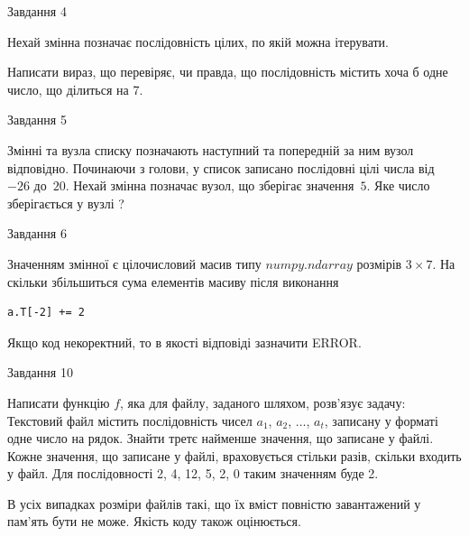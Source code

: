 \documentclass[12pt, ukrainian]{article}
\begin{document}
{               
{\begin{center}Завдання {4}\end{center}}
\vspace{-6mm}
Нехай змінна  позначає послідовність цілих, по якій можна ітерувати.

Написати вираз, що перевіряє, чи правда, що послідовність  містить хоча б одне число, що ділиться на 7.\par

\vspace{10mm}
               
{\begin{center}Завдання {5}\end{center}}
\vspace{-6mm}
Змінні  та  вузла списку позначають наступний та попередній за ним вузол відповідно. Починаючи з голови, у список записано послідовні цілі числа від~$-26$ до~$20$. Нехай змінна  позначає вузол, що зберігає значення~$5$.
Яке число зберігається у вузлі  ?\par

               
{\begin{center}Завдання {6}\end{center}}
\vspace{-6mm}
Значенням змінної  є цілочисловий масив типу $numpy.ndarray$ розмірів $3{\times}7$. На скільки збільшиться сума елементів масиву  після виконання
\begin{verbatim}
a.T[-2] += 2
\end{verbatim}


Якщо код некоректний, то в якості відповіді зазначити ERROR.\par

               
{\begin{center}Завдання {10}\end{center}}
\vspace{-6mm}

Написати функцію $f$, яка для файлу, заданого шляхом, розв’язує задачу:\\ Текстовий файл містить послідовність чисел $a_1$, $a_2$, $\ldots$, $a_t$, записану у форматі одне число на рядок. Знайти третє найменше значення, що записане у файлі. Кожне значення, що записане у файлі, враховується стільки разів, скільки входить у файл. Для послідовності 2, 4, 12, 5, 2, 0 таким значенням буде 2.

В усіх випадках розміри файлів такі, що їх вміст повністю завантажений у пам'ять бути не може. Якість коду також оцінюється.



}
\end{document}
